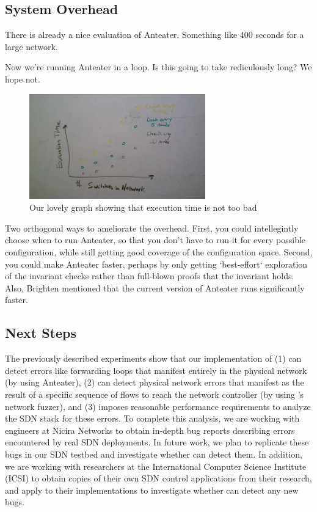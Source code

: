     
\subsection{System Overhead}

There is already a nice evaluation of Anteater. Something like 400 seconds for
a large network.

Now we're running Anteater in a
loop. Is this going to take rediculously long? We hope not.

\begin{figure}[t]
    \centering
    \includegraphics[width=3in]{../graphs/mock_overhead_graph.jpg}
    \caption[]{\label{fig:loop} Our lovely graph showing that execution time
    is not too bad\vspace{-10pt}} 
\end{figure}

Two orthogonal ways to ameliorate the overhead. First, you could intellegintly choose
when to run Anteater, so that you don't have to run it for every possible
configuration, while still getting good coverage of the
configuration space. Second, you could make Anteater faster, perhaps by only
getting `best-effort` exploration of the invariant checks rather than
full-blown proofs that the invariant holds. Also, Brighten mentioned that the
current version of Anteater runs significantly faster.

\subsection{Next Steps}
    The previously described experiments show that our implementation of \projectname{} (1) can detect errors like forwarding loops that manifest entirely in the physical network (by using Anteater), (2) can detect physical network errors that manifest as the result of a specific sequence of flows to reach the network controller (by using \projectname{}'s network fuzzer), and (3) imposes reasonable performance requirements to analyze the SDN stack for these errors.
    To complete this analysis, we are working with engineers at Nicira Networks to obtain in-depth bug reports describing errors encountered by real SDN deployments.
    In future work, we plan to replicate these bugs in our SDN testbed and investigate whether \projectname{} can detect them.
    In addition, we are working with researchers at the International Computer Science Institute (ICSI) to obtain copies of their own SDN control applications from their research, and apply \projectname{} to their implementations to investigate whether \projectname{} can detect any new bugs.

